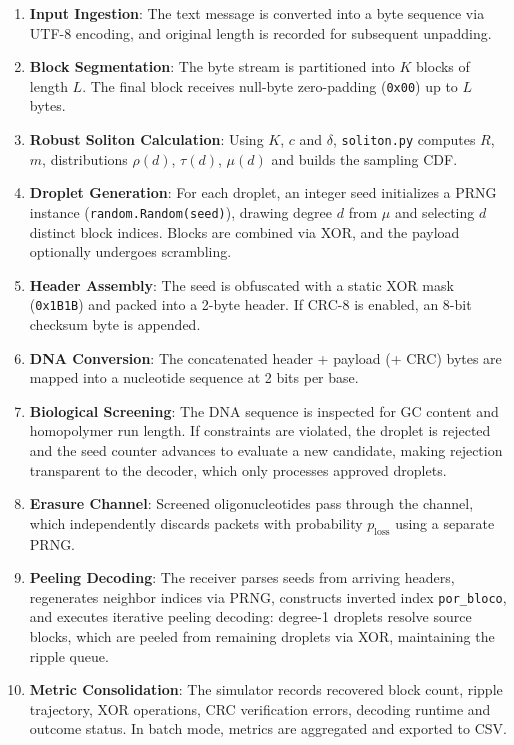 \begin{enumerate}
    \item \textbf{Input Ingestion}: The text message is converted into a byte sequence via UTF-8 encoding, and original length is recorded for subsequent unpadding.

    \item \textbf{Block Segmentation}: The byte stream is partitioned into $K$ blocks of length $L$. The final block receives null-byte zero-padding (\texttt{0x00}) up to $L$ bytes.

    \item \textbf{Robust Soliton Calculation}: Using $K$, $c$ and $\delta$, \texttt{soliton.py} computes $R$, $m$, distributions $\rho(d)$, $\tau(d)$, $\mu(d)$ and builds the sampling CDF.

    \item \textbf{Droplet Generation}: For each droplet, an integer seed initializes a PRNG instance (\texttt{random.Random(seed)}), drawing degree $d$ from $\mu$ and selecting $d$ distinct block indices. Blocks are combined via XOR, and the payload optionally undergoes scrambling.

    \item \textbf{Header Assembly}: The seed is obfuscated with a static XOR mask (\texttt{0x1B1B}) and packed into a 2-byte header. If CRC-8 is enabled, an 8-bit checksum byte is appended.

    \item \textbf{DNA Conversion}: The concatenated header + payload (+ CRC) bytes are mapped into a nucleotide sequence at 2 bits per base.

    \item \textbf{Biological Screening}: The DNA sequence is inspected for GC content and homopolymer run length. If constraints are violated, the droplet is rejected and the seed counter advances to evaluate a new candidate, making rejection transparent to the decoder, which only processes approved droplets.

    \item \textbf{Erasure Channel}: Screened oligonucleotides pass through the channel, which independently discards packets with probability $p_{\text{loss}}$ using a separate PRNG.

    \item \textbf{Peeling Decoding}: The receiver parses seeds from arriving headers, regenerates neighbor indices via PRNG, constructs inverted index \texttt{por\_bloco}, and executes iterative peeling decoding: degree-1 droplets resolve source blocks, which are peeled from remaining droplets via XOR, maintaining the ripple queue.

    \item \textbf{Metric Consolidation}: The simulator records recovered block count, ripple trajectory, XOR operations, CRC verification errors, decoding runtime and outcome status. In batch mode, metrics are aggregated and exported to CSV.
\end{enumerate}

